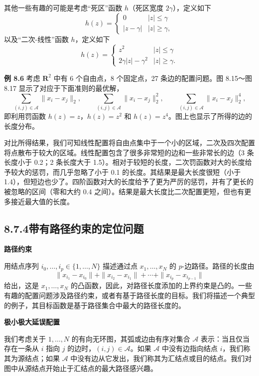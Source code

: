 \documentclass[UTF8, 12pt, fontset=fandol, oneside]{ctexart}
\begin{document}
其他一些有趣的可能是考虑“死区”函数 $h$（死区宽度 $2\gamma$），定义如下
\[
h(z)=
\begin{cases}
0 & |z|\leq \gamma\\
|z-\gamma| & |z|\geq \gamma,
\end{cases}
\]
以及“二次-线性”函数 $h$，定义如下
\[
h(z)=
\begin{cases}
z^2 & |z|\leq \gamma\\
2\gamma |z|-\gamma^2 & |z|\geq \gamma.
\end{cases}
\]

\noindent\textbf{例 8.6}\quad
考虑 $\mathbf{R}^2$ 中有 6 个自由点，8 个固定点，27 条边的配置问题。图 8.15～图 8.17 显示了对应于下面准则的最优解，
\[
\sum_{(i,j)\in\mathcal A}\|x_i-x_j\|_2,\qquad
\sum_{(i,j)\in\mathcal A}\|x_i-x_j\|_2^2,\qquad
\sum_{(i,j)\in\mathcal A}\|x_i-x_j\|_2^4,
\]
即利用罚函数 $h(z)=z$，$h(z)=z^2$ 和 $h(z)=z^4$。图上也显示了所得的边的长度分布。

对比所得结果，我们可知线性配置将自由点集中于一个小的区域，二次及四次配置将点散布于较大的区域。线性配置包含了很多非常短的边和一些非常长的边（3 条长度小于 0.2；2 条长度大于 1.5）。相对于较短的长度，二次罚函数对大的长度给予较大的惩罚，而几乎忽略了小于 0.1 的长度。其结果是最大长度很短（小于 1.4），但短边也少了。四阶函数对大的长度给予了更为严厉的惩罚，并有了更长的被忽略的区间（零和大约 0.4 之间）。结果是最大长度比二次配置更短，但也有更多接近最大值的长度。

\subsection*{8.7.4\quad 带有路径约束的定位问题}

\noindent\textbf{路径约束}

用结点序列 $i_0,\ldots,i_p\in\{1,\ldots,N\}$ 描述通过点 $x_1,\ldots,x_N$ 的 $p$-边路径。路径的长度由
\[
\|x_{i_1}-x_{i_0}\|+\|x_{i_2}-x_{i_1}\|+\cdots+\|x_{i_p}-x_{i_{p-1}}\|
\]
给出，这是 $x_1,\ldots,x_N$ 的凸函数，因此，对路径长度添加的上界约束是凸的。一些有趣的配置问题涉及路径约束，或者有基于路径长度的目标。我们将描述一个典型的例子，其目标函数是基于路径集合中最大的路径长度的。

\noindent\textbf{极小极大延误配置}

我们考虑关于 $1,\ldots,N$ 的有向无环图，其弧或边由有序对集合 $\mathcal A$ 表示：当且仅当存在一条从 $i$ 指向 $j$ 的边时，$(i,j)\in\mathcal A$。如果 $\mathcal A$ 中没有边指向结点 $i$，我们称其为源结点；如果 $\mathcal A$ 中没有边从它发出，我们称其为汇结点或目的结点。我们对图中从源结点开始止于汇结点的最大路径感兴趣。
\end{document}
